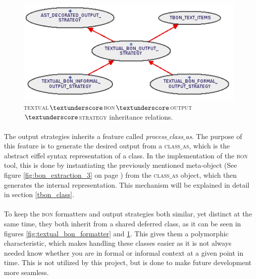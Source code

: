 \begin{figure}[h]
\centerline{
\includegraphics[scale=0.7]{images/bon-extraction-output-strategy.png}
}
\caption{\textsc{textual$\textunderscore$bon$\textunderscore$output$\textunderscore$strategy} inheritance relations.}
\label{fig:bon-extraction-output-strategy}
\end{figure}

\paragraph{}
The output strategies inherits a feature called \textit{process$\_$class$\_$as}. The purpose of this feature is to generate the desired output from a \textsc{class$\_$as}, which is the abstract eiffel syntax representation of a class. In the implementation of the \textsc{bon} tool, this is done by instantiating the previously mentioned meta-object (See figure \ref{fig:bon_extraction_3} on page \pageref{fig:bon_extraction_3}) from the \textsc{class$\_$as} object, which then generates the internal representation. This mechanism will be explained in detail in section \ref{tbon_class}.

\paragraph{}
To keep the \textsc{bon} formatters and output strategies both similar, yet distinct at the same time, they both inherit from a shared deferred class, as it can be seen in figures \ref{fig:textual_bon_formatter} and \ref{fig:bon-extraction-output-strategy}. This gives them a polymorphic characteristic, which makes handling these classes easier as it is not always needed know whether you are in formal or informal context at a given point in time. This is not utilized by this project, but is done to make future development more seamless. 

